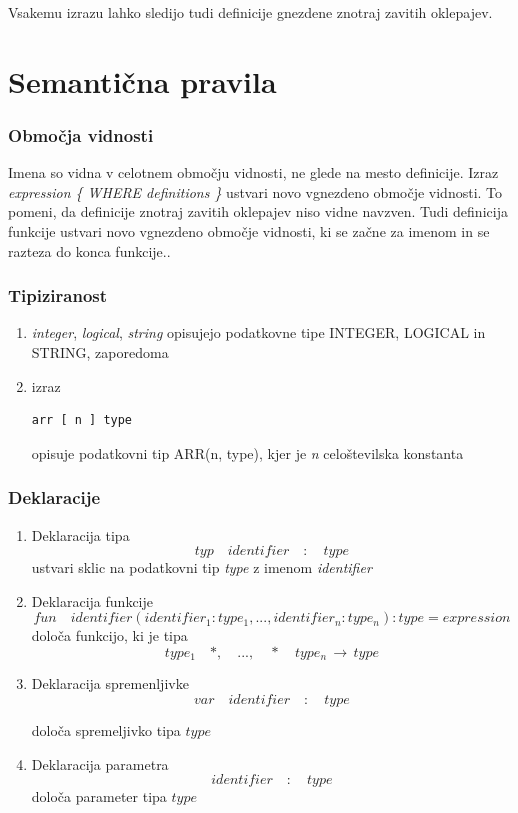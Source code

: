\documentclass[a4paper, 12p]{book}
\begin{document}
Vsakemu izrazu lahko sledijo tudi definicije gnezdene znotraj zavitih oklepajev.

\section{Semantična pravila}

\subsubsection{Območja vidnosti}

Imena so vidna v celotnem območju vidnosti, ne glede na mesto definicije. Izraz \textit{expression \{ WHERE definitions \}} ustvari novo vgnezdeno območje vidnosti. To pomeni, da definicije znotraj zavitih oklepajev niso vidne navzven. Tudi definicija funkcije ustvari novo vgnezdeno območje vidnosti, ki se začne za imenom in se razteza do konca funkcije..

\subsubsection{Tipiziranost}

\begin{enumerate}
	\item \textit{integer}, \textit{logical}, \textit{string} opisujejo podatkovne tipe INTEGER, LOGICAL in STRING, zaporedoma
	\item izraz 
\begin{lstlisting}[]
	arr [ n ] type
\end{lstlisting}
	opisuje podatkovni tip ARR(n, type), kjer je \textit{n} celoštevilska konstanta 
\end{enumerate}

\subsubsection{Deklaracije}

\begin{enumerate}
	\item Deklaracija tipa
\[
typ\quad  identifier\quad  :\quad  type
\]
	ustvari sklic na podatkovni tip \textit{type} z imenom \textit{identifier}
	\item Deklaracija funkcije
\[ fun\quad identifier  ( identifier_1 : type_1, ..., identifier_n : type_n ) : type = expression \]
	določa funkcijo, ki je tipa \[type_1 \quad *, \quad  ..., \quad *\quad  type_n \,\to\, type \]
	\item Deklaracija spremenljivke
\[
var \quad identifier\quad :\quad type
\]

določa spremeljivko tipa $type$
	\item Deklaracija parametra
\[
identifier \quad :\quad type
\]
določa parameter tipa $type$
\end{enumerate}
\end{document}
